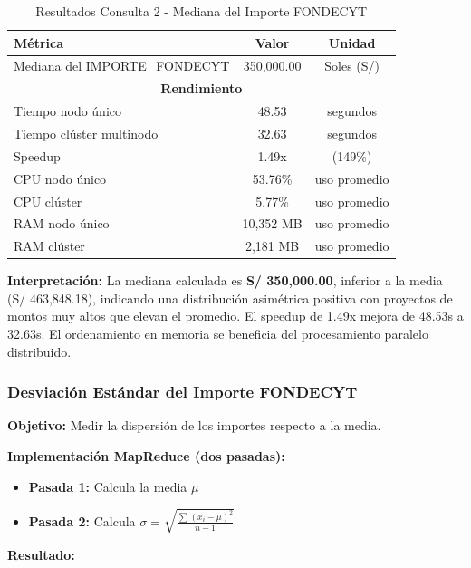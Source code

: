 \documentclass[12pt,a4paper]{article}
\begin{document}
\begin{table}[H]
\centering
\begin{tabular}{lcc}
\toprule
\textbf{Métrica} & \textbf{Valor} & \textbf{Unidad} \\
\midrule
Mediana del IMPORTE\_FONDECYT & 350,000.00 & Soles (S/) \\
\midrule
\multicolumn{3}{c}{\textbf{Rendimiento}} \\
\midrule
Tiempo nodo único & 48.53 & segundos \\
Tiempo clúster multinodo & 32.63 & segundos \\
Speedup & 1.49x & (149\%) \\
\midrule
CPU nodo único & 53.76\% & uso promedio \\
CPU clúster & 5.77\% & uso promedio \\
RAM nodo único & 10,352 MB & uso promedio \\
RAM clúster & 2,181 MB & uso promedio \\
\bottomrule
\end{tabular}
\caption{Resultados Consulta 2 - Mediana del Importe FONDECYT}
\label{tab:mediana}
\end{table}

\textbf{Interpretación:} La mediana calculada es \textbf{S/ 350,000.00}, inferior a la media (S/ 463,848.18), indicando una distribución asimétrica positiva con proyectos de montos muy altos que elevan el promedio. El speedup de 1.49x mejora de 48.53s a 32.63s. El ordenamiento en memoria se beneficia del procesamiento paralelo distribuido.

\subsubsection{Desviación Estándar del Importe FONDECYT}

\textbf{Objetivo:} Medir la dispersión de los importes respecto a la media.

\textbf{Implementación MapReduce (dos pasadas):}
\begin{itemize}
    \item \textbf{Pasada 1:} Calcula la media $\mu$
    \item \textbf{Pasada 2:} Calcula $\sigma = \sqrt{\frac{\sum(x_i - \mu)^2}{n-1}}$
\end{itemize}

\textbf{Resultado:}
\end{document}
